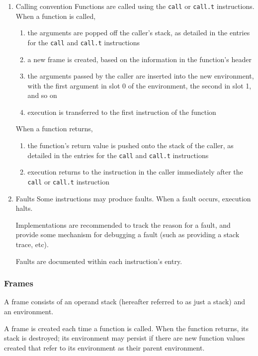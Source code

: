 \documentclass[11pt]{article}
\begin{document}
\begin{enumerate}
\item Calling convention
\label{sec:orgd5ca986}
Functions are called using the \texttt{call} or \texttt{call.t} instructions. When a
function is called,

\begin{enumerate}
\item the arguments are popped off the caller's stack, as detailed in the
entries for the \texttt{call} and \texttt{call.t} instructions
\item a new frame is created, based on the information in the function's
header
\item the arguments passed by the caller are inserted into the new
environment, with the first argument in slot 0 of the environment,
the second in slot 1, and so on
\item execution is transferred to the first instruction of the function
\end{enumerate}

When a function returns,

\begin{enumerate}
\item the function's return value is pushed onto the stack of the caller,
as detailed in the entries for the \texttt{call} and \texttt{call.t} instructions
\item execution returns to the instruction in the caller immediately after
the \texttt{call} or \texttt{call.t} instruction
\end{enumerate}

\item Faults
\label{sec:org8f767f1}
Some instructions may produce faults. When a fault occurs, execution
halts.

Implementations are recommended to track the reason for a fault, and
provide some mechanism for debugging a fault (such as providing a stack
trace, etc).

Faults are documented within each instruction's entry.
\end{enumerate}

\subsubsection{Frames}
\label{sec:org6149cad}
A frame consists of an operand stack (hereafter referred to as just a
stack) and an environment.

A frame is created each time a function is called. When the function
returns, its stack is destroyed; its environment may persist if there
are new function values created that refer to its environment as their
parent environment.
\end{document}
